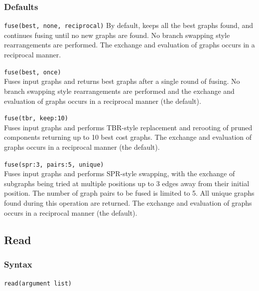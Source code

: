 	\subsubsection{Defaults}
		\texttt{fuse(best, none, reciprocal)} By default, \phyg keeps all the best graphs found, and 
		continues fusing until no new graphs are found. No branch swapping style rearrangements 
		are performed. The exchange and evaluation of graphs occurs in a reciprocal manner. 
			
	\begin{example}
		\item{\texttt{fuse(best, once)}\\Fuses input graphs and returns best graphs after a single round of 
		fusing. No branch swapping style rearrangements are performed and the exchange and evaluation 
		of graphs occurs in a reciprocal manner (the default).}
		
		\item{\texttt{fuse(tbr, keep:10)} \\Fuses input graphs and performs TBR-style replacement and 
		rerooting of pruned components returning up to 10 best cost graphs. The exchange and evaluation 
		  of graphs occurs in a reciprocal manner (the default).}
		
		\item{\texttt{fuse(spr:3, pairs:5, unique)} \\Fuses input graphs and performs SPR-style swapping, 
		with the exchange of subgraphs being tried at multiple positions up to 3 edges away from their 
		initial position. The number of graph pairs to be fused is limited to 5. All unique graphs found
		during this operation are returned. The exchange and evaluation of graphs occurs in a reciprocal 
		manner (the default)}.
	\end{example}

\subsection{Read}
\label{subsec:read}
	\subsubsection{Syntax}
		\texttt{read(argument list)}
			
